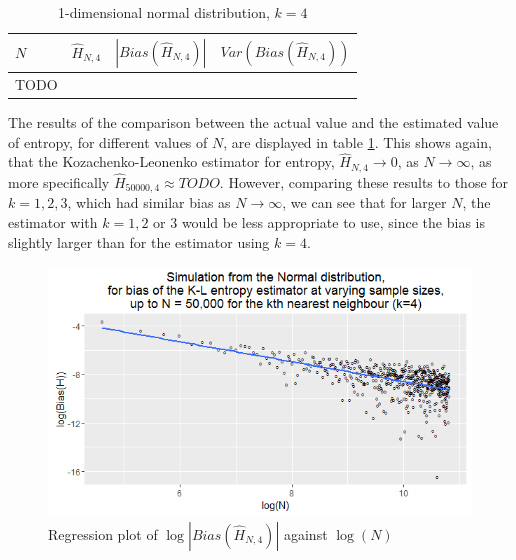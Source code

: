 \documentclass{article}
\begin{document}
\begin{table}
\caption{1-dimensional normal distribution, $k=4$} \label{normal_k=4_table}
\begin{center}
\begin{tabular}{| l | c c c|} 
\toprule
$N$ & $\hat{H}_{N, 4}$ & $|Bias(\hat{H}_{N, 4})|$ & $Var(Bias(\hat{H}_{N, 4}))$ \\
\midrule[1pt]
TODO & & & \\
\hline
\end{tabular}
\end{center}
\end{table}

The results of the comparison between the actual value and the estimated value of entropy, for different values of $N$, are displayed in table \ref{normal_k=4_table}. This shows again, that the Kozachenko-Leonenko estimator for entropy, $\hat{H}_{N, 4} \to 0$, as $N \to \infty$, as more specifically $\hat{H}_{50000, 4} \approx TODO$. However, comparing these results to those for $k=1, 2, 3$, which had similar bias as $N \to \infty$, we can see that for larger $N$, the estimator with $k=1, 2$ or $3$ would be less appropriate to use, since the bias is slightly larger than for the estimator using $k=4$.

\begin{figure}
  \begin{center}
    \includegraphics[width=\textwidth]{./Graphs/new_normal_k=4.png}
  \end{center}
\caption{Regression plot of $\log|Bias(\hat{H}_{N, 4})|$ against $\log(N)$}
  \label{normal_k=4_graph}
\end{figure}
\end{document}

